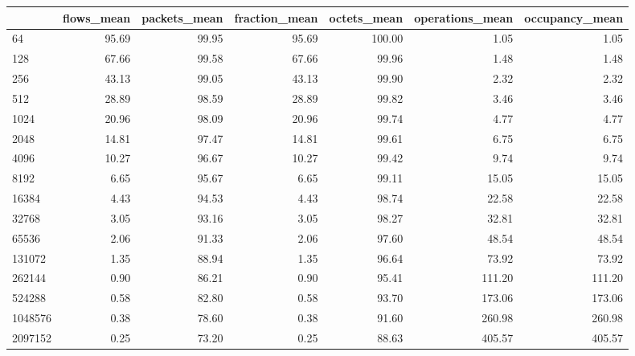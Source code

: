 \begin{tabular}{lrrrrrr}
\toprule
{} &  flows\_mean &  packets\_mean &  fraction\_mean &  octets\_mean &  operations\_mean &  occupancy\_mean \\
\midrule
64         &       95.69 &         99.95 &          95.69 &       100.00 &             1.05 &            1.05 \\
128        &       67.66 &         99.58 &          67.66 &        99.96 &             1.48 &            1.48 \\
256        &       43.13 &         99.05 &          43.13 &        99.90 &             2.32 &            2.32 \\
512        &       28.89 &         98.59 &          28.89 &        99.82 &             3.46 &            3.46 \\
1024       &       20.96 &         98.09 &          20.96 &        99.74 &             4.77 &            4.77 \\
2048       &       14.81 &         97.47 &          14.81 &        99.61 &             6.75 &            6.75 \\
4096       &       10.27 &         96.67 &          10.27 &        99.42 &             9.74 &            9.74 \\
8192       &        6.65 &         95.67 &           6.65 &        99.11 &            15.05 &           15.05 \\
16384      &        4.43 &         94.53 &           4.43 &        98.74 &            22.58 &           22.58 \\
32768      &        3.05 &         93.16 &           3.05 &        98.27 &            32.81 &           32.81 \\
65536      &        2.06 &         91.33 &           2.06 &        97.60 &            48.54 &           48.54 \\
131072     &        1.35 &         88.94 &           1.35 &        96.64 &            73.92 &           73.92 \\
262144     &        0.90 &         86.21 &           0.90 &        95.41 &           111.20 &          111.20 \\
524288     &        0.58 &         82.80 &           0.58 &        93.70 &           173.06 &          173.06 \\
1048576    &        0.38 &         78.60 &           0.38 &        91.60 &           260.98 &          260.98 \\
2097152    &        0.25 &         73.20 &           0.25 &        88.63 &           405.57 &          405.57 \\

\end{tabular}
